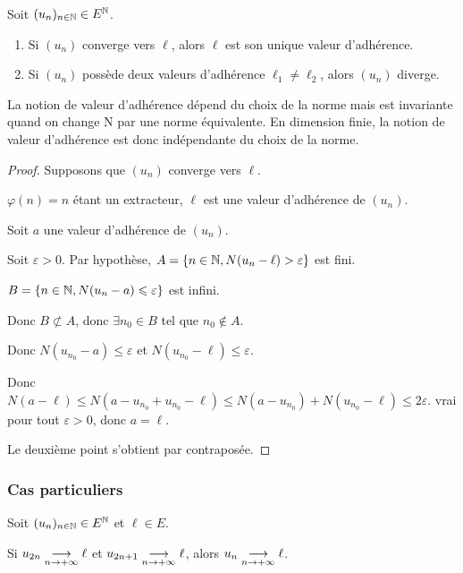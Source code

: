 \begin{proposition}{}{}
    Soit $(u_n)_{n \in \mathbb{N}} \in E^{\mathbb{N}}$. 

    \begin{enumerate}
        \item Si $(u_n)$ converge vers $\ell$, alors $\ell$ est son unique valeur d'adhérence. 
        \item Si $(u_n)$ possède deux valeurs d'adhérence $\ell_1 \neq \ell_2$, alors $(u_n)$ diverge.
    \end{enumerate}
\end{proposition}

\begin{remarque}
    La notion de valeur d'adhérence dépend du choix de la norme mais est invariante 
    quand on change N par une norme équivalente. En dimension finie, la notion de valeur d'adhérence
    est donc indépendante du choix de la norme. 
\end{remarque}


\begin{proof}
    Supposons que $(u_n)$ converge vers $\ell$.

    $\varphi(n) =n$ étant un extracteur, $\ell$ est une valeur d'adhérence de $(u_n)$.

    \svspace Soit $a$ une valeur d'adhérence de $(u_n)$.
    
    Soit $\varepsilon > 0$. Par hypothèse, $A = \{n \in \mathbb{N}, N(u_n - \ell) > \varepsilon\}$ est 
    fini. 

    $B = \{n \in \mathbb{N}, N(u_n - a) \leqslant \varepsilon \}$ est infini. 

    Donc $B \not\subset A$, donc $\exists n_0 \in B$ tel que $n_0 \not\in A$.

    Donc $N(u_{n_0} - a) \leqslant \varepsilon$ et $N(u_{n_0} - \ell) \leqslant \varepsilon$.

    Donc $N(a - \ell) \leqslant N(a - u_{n_0} + u_{n_0} - \ell) \leqslant N(a - u_{n_0}) + N(u_{n_0} - \ell) \leqslant 2\varepsilon$.
    vrai pour tout $\varepsilon > 0$, donc $a = \ell$.

    Le deuxième point s'obtient par contraposée.
\end{proof}


\subsubsection{Cas particuliers}

\begin{proposition}{}{}
    Soit $(u_n)_{n \in \mathbb{N}} \in E^{\mathbb{N}}$ et $\ell \in E$.

    Si $u_{2n} \underset{n \to +\infty}{\longrightarrow} \ell$ et $u_{2n + 1} \underset{n \to +\infty}{\longrightarrow} \ell$, alors
    $u_n \underset{n \to +\infty}{\longrightarrow} \ell$.
\end{proposition}

